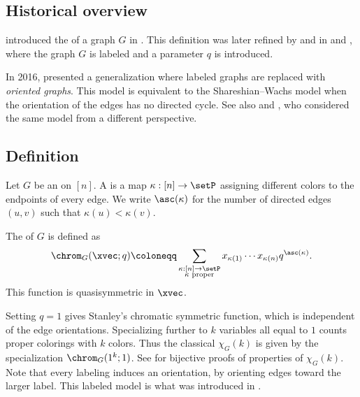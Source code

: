 \subsection[chromaticQuasisymmetricHistory]{Historical overview}

 introduced the \label{chromaticSymmetricFunction}
of a graph $G$ in \cite{Stanley1995}.
This definition was later refined by 
and  in \cite{ShareshianWachs2012} and \cite{ShareshianWachs2016},
where the graph $G$ is labeled and a parameter $q$ is introduced.

In 2016,  \cite{Ellzey2017} presented a generalization
where labeled graphs are replaced with \emph{oriented graphs}.
This model is equivalent to the Shareshian--Wachs model when the orientation
of the edges has no directed cycle.
See also  and 
\cite{AlexanderssonPanova2018}, who considered the same model from a different
perspective.


\subsection[chromaticQuasisymmetricDefinition]{Definition}

Let $G$ be an \label{orientedGraph} on $[n]$.
A \label{properColoring} is a map
$\kappa:[n]\to\setP$ assigning different colors to the endpoints of every edge.
We write $\asc(\kappa)$ for the number of directed edges $(u,v)$ such that
$\kappa(u)\lt\kappa(v)$.

The \label{chromaticQuasisymmetricFunction}
of $G$ is defined as
\[
\chrom_G(\xvec;q) \coloneqq
\sum_{\substack{\kappa : [n]\to \setP \\ \kappa \text{ proper}}}
x_{\kappa(1)}\dotsm x_{\kappa(n)} q^{\asc(\kappa)}.
\]
This function is quasisymmetric in $\xvec$.

Setting $q=1$ gives Stanley's chromatic symmetric function, which is
independent of the edge orientations. Specializing further to $k$ variables
all equal to $1$ counts proper colorings with $k$ colors. Thus the classical
\label{chromaticPolynomial}
$\chi_G(k)$ is given by the specialization $\chrom_G(1^k;1)$.
See \cite{SaganVatter2021} for bijective proofs of
properties of $\chi_G(k)$.
Note that every labeling induces an orientation, by orienting edges toward the
larger label.
This labeled model is what was introduced in \cite{ShareshianWachs2012,ShareshianWachs2016}.


